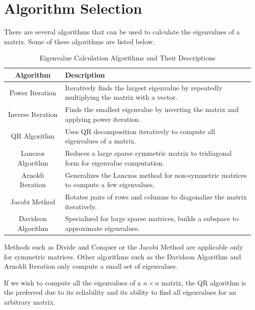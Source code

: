 \documentclass{article}
\begin{document}
\section{Algorithm Selection}

There are several algorithms that can be used to calculate the eigenvalues of a matrix.
Some of these algorithms are listed below.

\begin{table}[h!]
    \centering
    \begin{tabular}{|c|p{6cm}|}
    \hline
    \textbf{Algorithm}        & \textbf{Description} \\
    \hline
    Power Iteration           & Iteratively finds the largest eigenvalue by repeatedly multiplying the matrix with a vector. \\
    \hline
    Inverse Iteration         & Finds the smallest eigenvalue by inverting the matrix and applying power iteration. \\
    \hline
    QR Algorithm              & Uses QR decomposition iteratively to compute all eigenvalues of a matrix. \\
    \hline
    Lanczos Algorithm         & Reduces a large sparse symmetric matrix to tridiagonal form for eigenvalue computation. \\
    \hline
    Arnoldi Iteration         & Generalizes the Lanczos method for non-symmetric matrices to compute a few eigenvalues. \\
    \hline
    Jacobi Method             & Rotates pairs of rows and columns to diagonalize the matrix iteratively. \\
    \hline
    Davidson Algorithm        & Specialized for large sparse matrices, builds a subspace to approximate eigenvalues. \\
    \hline
    \end{tabular}
    \caption{Eigenvalue Calculation Algorithms and Their Descriptions}
    \label{tab:eigenvalue_algorithms}
\end{table}
    

Methods such as Divide and Conquer or the Jacobi Method are applicable only for symmetric
matrices. Other algorithms such as the Davidson Algorithm and Arnoldi Iteration only compute a
small set of eigenvalues.

If we wish to compute all the eigenvalues of a $n \times n$ matrix, the
QR algorithm is the preferred due to its reliability and its ability
to find all eigenvalues for an arbitrary matrix.
\end{document}
